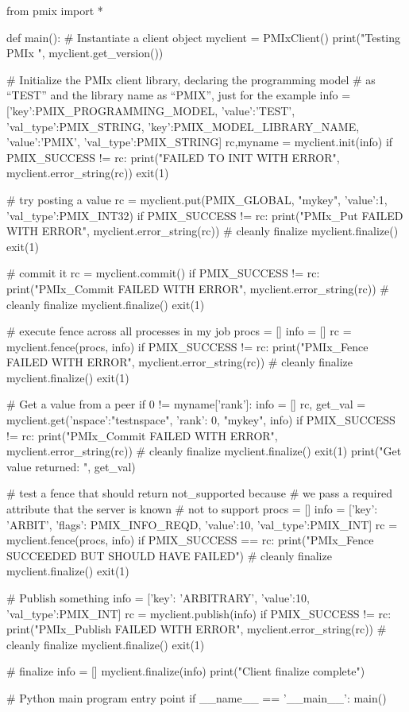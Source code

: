 \pyspecificstart
\begin{codepar}
from pmix import *

def main():
    # Instantiate a client object
    myclient = PMIxClient()
    print("Testing PMIx ", myclient.get_version())

    # Initialize the PMIx client library, declaring the programming model
    # as “TEST” and the library name as “PMIX”, just for the example
    info = [{'key':PMIX_PROGRAMMING_MODEL,
             'value':'TEST', 'val_type':PMIX_STRING},
            {'key':PMIX_MODEL_LIBRARY_NAME,
             'value':'PMIX', 'val_type':PMIX_STRING}]
    rc,myname = myclient.init(info)
    if PMIX_SUCCESS != rc:
        print("FAILED TO INIT WITH ERROR", myclient.error_string(rc))
        exit(1)

    # try posting a value
    rc = myclient.put(PMIX_GLOBAL, "mykey",
                      {'value':1, 'val_type':PMIX_INT32})
    if PMIX_SUCCESS != rc:
        print("PMIx_Put FAILED WITH ERROR", myclient.error_string(rc))
        # cleanly finalize
        myclient.finalize()
        exit(1)

    # commit it
    rc = myclient.commit()
    if PMIX_SUCCESS != rc:
        print("PMIx_Commit FAILED WITH ERROR",
              myclient.error_string(rc))
        # cleanly finalize
        myclient.finalize()
        exit(1)

    # execute fence across all processes in my job
    procs = []
    info = []
    rc = myclient.fence(procs, info)
    if PMIX_SUCCESS != rc:
        print("PMIx_Fence FAILED WITH ERROR", myclient.error_string(rc))
        # cleanly finalize
        myclient.finalize()
        exit(1)

    # Get a value from a peer
    if 0 != myname['rank']:
        info = []
        rc, get_val = myclient.get({'nspace':"testnspace", 'rank': 0},
                                   "mykey", info)
        if PMIX_SUCCESS != rc:
            print("PMIx_Commit FAILED WITH ERROR",
                  myclient.error_string(rc))
            # cleanly finalize
            myclient.finalize()
            exit(1)
        print("Get value returned: ", get_val)

    # test a fence that should return not_supported because
    # we pass a required attribute that the server is known
    # not to support
    procs = []
    info = [{'key': 'ARBIT', 'flags': PMIX_INFO_REQD,
             'value':10, 'val_type':PMIX_INT}]
    rc = myclient.fence(procs, info)
    if PMIX_SUCCESS == rc:
        print("PMIx_Fence SUCCEEDED BUT SHOULD HAVE FAILED")
        # cleanly finalize
        myclient.finalize()
        exit(1)

    # Publish something
    info = [{'key': 'ARBITRARY', 'value':10, 'val_type':PMIX_INT}]
    rc = myclient.publish(info)
    if PMIX_SUCCESS != rc:
        print("PMIx_Publish FAILED WITH ERROR",
              myclient.error_string(rc))
        # cleanly finalize
        myclient.finalize()
        exit(1)

    # finalize
    info = []
    myclient.finalize(info)
    print("Client finalize complete")

# Python main program entry point
if __name__ == '__main__':
    main()
\end{codepar}
